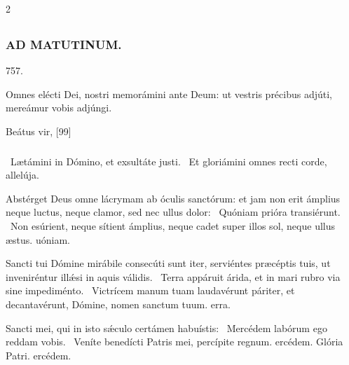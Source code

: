 \documentclass[9pt,twoside]{extarticle}
\begin{document}
\begin{multicols}{2}
\subsection*{\center \textsc{}}
\subsubsection*{\center \textsc{AD MATUTINUM.}}

\begin{tightlist}{}
\item {} 757.
\item {} Omnes elécti Dei, nostri memorámini ante Deum: ut vestris précibus adjúti, mereámur vobis adjúngi.
\item {} Beátus vir,  [99] 
\item {}
\item {}
\end{tightlist}

\subsubsection*{}
\begin{tightlist}{}
\item {}~Lætámini in Dómino, et exsultáte justi. ~Et gloriámini omnes recti corde, allelúja.
\item {} Abstérget Deus omne lácrymam ab óculis sanctórum: et jam non erit ámplius neque luctus, neque clamor, sed nec ullus dolor: \textred{*}~Quóniam prióra transiérunt.
~Non esúrient, neque sítient ámplius, neque cadet super illos sol, neque ullus æstus. uóniam.
\item {} Sancti tui Dómine mirábile consecúti sunt iter, serviéntes præcéptis tuis, ut inveniréntur illǽsi in aquis válidis. \textred{*}~Terra appáruit árida, et in mari rubro via sine impediménto.
~Victrícem manum tuam laudavérunt páriter, et decantavérunt, Dómine, nomen sanctum tuum. erra.
\item {} Sancti mei, qui in isto sǽculo certámen habuístis: \textred{*}~Mercédem labórum ego reddam vobis.
~Veníte benedícti Patris mei, percípite regnum. ercédem. Glória Patri. ercédem.
\end{tightlist}


\end{multicols}
\end{document}
